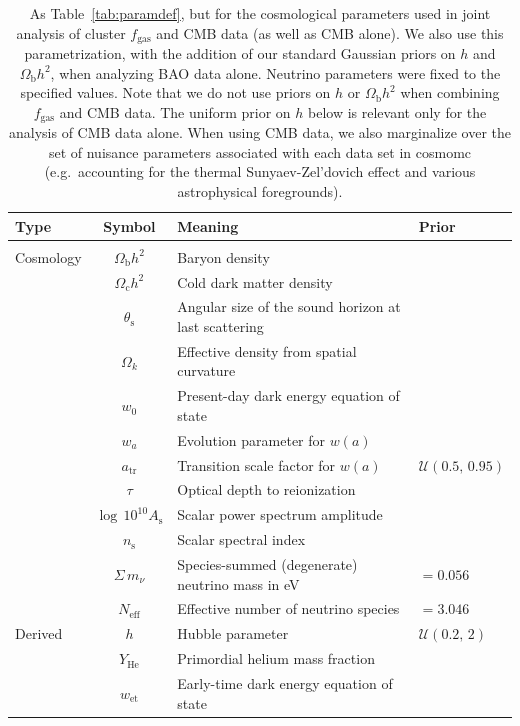 \documentclass[useAMS,usenatbib,usegraphicx]{mn2e}
\newcommand*{\mysub}[2]{\ensuremath{#1_{\mathrm{#2}}}}
\newcommand*{\Omegab}{\mysub{\Omega}{b}}
\newcommand*{\fgas}{\mysub{f}{gas}}
\newcommand*{\YHe}{\mysub{Y}{He}}
\newcommand*{\atr}{\mysub{a}{tr}}
\newcommand*{\wet}{\mysub{w}{et}}
\newcommand*{\dunif}{\ensuremath{\mathcal{U}}}
\newcommand*{\tabref}{Table}
\begin{document}
\begin{table}
  \centering
  \caption{As \tabref~\ref{tab:paramdef}, but for the cosmological parameters used in joint analysis of cluster \fgas{} and CMB data (as well as CMB alone). We also use this parametrization, with the addition of our standard Gaussian priors on $h$ and $\Omegab h^2$, when analyzing BAO data alone. Neutrino parameters were fixed to the specified values. Note that we do not use priors on $h$  or $\Omegab h^2$ when combining \fgas{} and CMB data. The uniform prior on $h$ below is relevant only for the analysis of CMB data alone. When using CMB data, we also marginalize over the set of nuisance parameters associated with each data set in {\sc cosmomc} (e.g.\ accounting for the thermal Sunyaev-Zel'dovich effect and various astrophysical foregrounds).}
  \vspace{1ex}
  \begin{tabular}{lcll}
    \hline
    Type & Symbol & Meaning & Prior \\
    \hline\vspace{-1.5ex}\\
    Cosmology
    & $\Omegab h^2$ & Baryon density & \\
    & $\mysub{\Omega}{c} h^2$ & Cold dark matter density & \\
    & $\theta_\mathrm{s}$ & Angular size of the sound horizon at last scattering & \\
    & $\Omega_k$ & Effective density from spatial curvature & \\
    & $w_0$ & Present-day dark energy equation of state & \\
    & $w_a$ & Evolution parameter for $w(a)$ & \\
    & $\atr$ & Transition scale factor for $w(a)$ & $\dunif(0.5, \, 0.95)$ \\
    & $\tau$ & Optical depth to reionization & \\
    & $\log\,10^{10}\mysub{A}{s}$ & Scalar power spectrum amplitude & \\
    & $\mysub{n}{s}$ & Scalar spectral index & \\
    & $\Sigma\,m_\nu$ & Species-summed (degenerate) neutrino mass in eV & $=0.056$ \\
    & $\mysub{N}{eff}$ & Effective number of neutrino species & $=3.046$\vspace{1ex}\\
    Derived
    & $h$ & Hubble parameter & $\dunif(0.2, \, 2)$ \\
    & $\YHe$ & Primordial helium mass fraction & \\
    & $\wet$ & Early-time dark energy equation of state &\vspace{1ex}\\    
    \hline
  \end{tabular}
  \label{tab:paramcmb}
\end{table}
 
\end{document}
